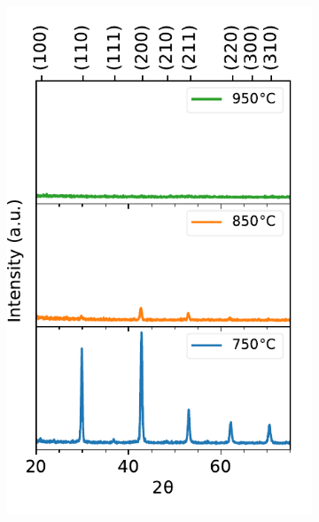\begin{figure}

    \centering
    \begin{subfigure}[b]{0.45\linewidth}
        
        \includegraphics[width=\linewidth]{Figures/180316-thin-film-2theta.pdf}
        \caption{}
        \label{fig:film:xrd:2theta}
    \end{subfigure}\hspace{.125in}
    \begin{subfigure}[b]{0.45\linewidth}

\end{subfigure}
\end{figure}
